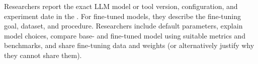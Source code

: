 Researchers \must report the exact LLM model or tool version, configuration, and experiment date in the \paper. For fine-tuned models, they \must describe the fine-tuning goal, dataset, and procedure. Researchers \should include default parameters, explain model choices, compare base- and fine-tuned model using suitable metrics and benchmarks, and share fine-tuning data and weights (or alternatively justify why they cannot share them).